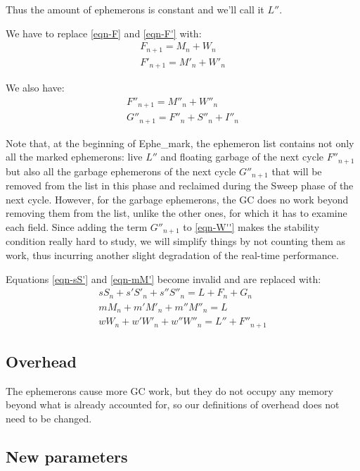 \documentclass{article}
\begin{document}
Thus the amount of ephemerons is constant and we'll call it $L''$.

We have to replace \eqref{eqn-F} and \eqref{eqn-F'} with:
\begin{gather}
F_{n+1} = M_n + W_n  \label{eqn-FW} \\
F'_{n+1} = M'_n + W'_n  \label{eqn-F'W}
\end{gather}

We also have:
\begin{gather}
F''_{n+1} = M''_n + W''_n  \label{eqn-F''} \\
G''_{n+1} = F''_n + S''_n + I''_n   \label{eqn-G''}
\end{gather}

Note that,
at the beginning of Ephe\_mark, the ephemeron list contains not only
all the marked ephemerons: live $L''$ and floating garbage of the next
cycle $F''_{n+1}$ but also all the garbage ephemerons of the next
cycle $G''_{n+1}$ that will be removed from the list in this phase
and reclaimed
during the Sweep phase of the next cycle. However, for the garbage
ephemerons, the GC does no work beyond removing them from the list,
unlike the other ones, for which it has to examine each field. Since
adding the term $G''_{n+1}$ to \eqref{eqn-W''} makes the stability
condition really hard
to study, we will simplify things by not counting them as work, thus
incurring another slight degradation of the real-time performance.

Equations
\eqref{eqn-sS'} and \eqref{eqn-mM'} become invalid and are replaced with:
\begin{gather}
sS_n + s'S'_n + s''S''_n = L + F_n + G_n \label{eqn-sS''}  \\
mM_n + m'M'_n + m''M''_n = L  \label{eqn-mM''} \\
wW_n + w'W'_n + w''W''_n = L'' + F''_{n+1}  \label{eqn-wW''}
\end{gather}


\subsection{Overhead}

The ephemerons cause more GC work, but they do not occupy any memory
beyond what is already accounted for, so our definitions of overhead
does not need to be changed.

\subsection{New parameters}
\end{document}
